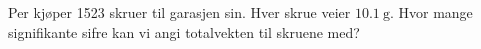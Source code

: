 %
Per kjøper 1523 skruer til garasjen sin. Hver skrue veier $\SI{10.1}{\gram}$.
Hvor mange signifikante sifre kan vi angi totalvekten til skruene med?
